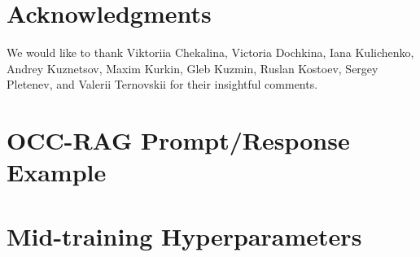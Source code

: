 \documentclass{article}
\begin{document}
\section{Acknowledgments}
We would like to thank Viktoriia Chekalina, Victoria Dochkina, Iana Kulichenko, Andrey Kuznetsov, Maxim Kurkin, Gleb Kuzmin, Ruslan Kostoev, Sergey Pletenev, and Valerii Ternovskii for their insightful comments.




\newpage
\appendix
% 
\section{OCC-RAG Prompt/Response Example}
\label{sec:prompt-trace}

\newpage
% 
% 
% 
\section{Mid-training Hyperparameters}
\label{appendix:training-hyperparameters}

\end{document}
